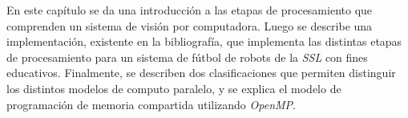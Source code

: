 
En este capítulo se da una introducción a las etapas de procesamiento que
comprenden un sistema de visión por computadora. Luego se describe una
implementación, existente en la bibliografía, que implementa las distintas
etapas de procesamiento para un sistema de fútbol de robots de la \emph{SSL} con
fines educativos. Finalmente, se describen dos clasificaciones que permiten
distinguir los distintos modelos de computo paralelo, y se explica el modelo de
programación de memoria compartida utilizando \emph{OpenMP}.
